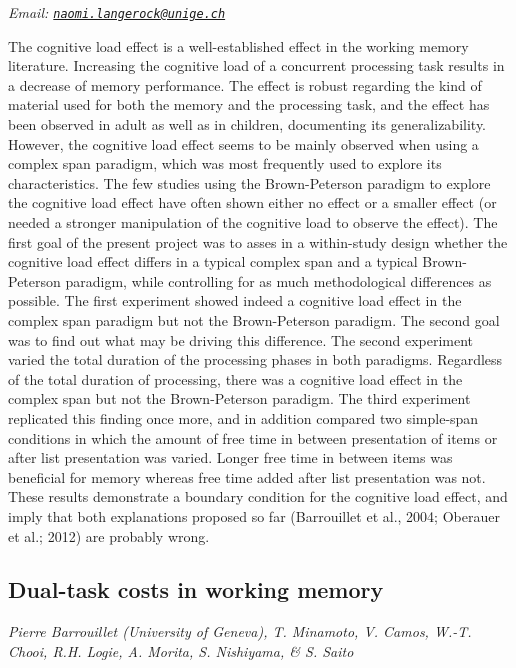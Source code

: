 \documentclass[12pt,]{book}
\begin{document}
\emph{Email: \href{mailto:naomi.langerock@unige.ch}{\nolinkurl{naomi.langerock@unige.ch}}}

The cognitive load effect is a well-established effect in the working memory literature. Increasing the cognitive load of a concurrent processing task results in a decrease of memory performance. The effect is robust regarding the kind of material used for both the memory and the processing task, and the effect has been observed in adult as well as in children, documenting its generalizability. However, the cognitive load effect seems to be mainly observed when using a complex span paradigm, which was most frequently used to explore its characteristics. The few studies using the Brown-Peterson paradigm to explore the cognitive load effect have often shown either no effect or a smaller effect (or needed a stronger manipulation of the cognitive load to observe the effect). The first goal of the present project was to asses in a within-study design whether the cognitive load effect differs in a typical complex span and a typical Brown-Peterson paradigm, while controlling for as much methodological differences as possible. The first experiment showed indeed a cognitive load effect in the complex span paradigm but not the Brown-Peterson paradigm. The second goal was to find out what may be driving this difference. The second experiment varied the total duration of the processing phases in both paradigms. Regardless of the total duration of processing, there was a cognitive load effect in the complex span but not the Brown-Peterson paradigm. The third experiment replicated this finding once more, and in addition compared two simple-span conditions in which the amount of free time in between presentation of items or after list presentation was varied. Longer free time in between items was beneficial for memory whereas free time added after list presentation was not. These results demonstrate a boundary condition for the cognitive load effect, and imply that both explanations proposed so far (Barrouillet et al., 2004; Oberauer et al.; 2012) are probably wrong.

\hypertarget{dual-task-costs-in-working-memory}{%
\subsection{Dual-task costs in working memory}\label{dual-task-costs-in-working-memory}}

\emph{Pierre Barrouillet (University of Geneva), T. Minamoto, V. Camos, W.-T. Chooi, R.H. Logie, A. Morita, S. Nishiyama, \& S. Saito}
\end{document}
